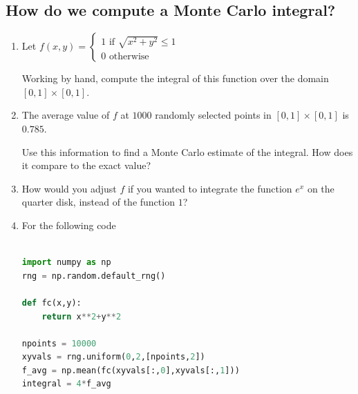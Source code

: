 \documentclass[12pt,letterpaper,noanswers]{exam}
\begin{document}
\subsection*{How do we compute a Monte Carlo integral?}

\begin{enumerate}[resume]
    \item Let $f(x,y) = \left\{\begin{array}{l} 1\text{ if } \sqrt{x^2+y^2}\leq 1 \\
    0 \text{ otherwise }
     \end{array}\right.$

    Working by hand, compute the integral of this function over the domain $[0,1]\times [0,1]$.

\vspace{1in}
    
     \item The average value of $f$ at $1000$ randomly selected points in $[0,1]\times [0,1]$ is $0.785$.

     Use this information to find a Monte Carlo estimate of the integral.  How does it compare to the exact value?

     \vspace{1in}

     \item How would you adjust $f$ if you wanted to integrate the function $e^x$ on the quarter disk, instead of the function $1$?

\vspace{1in}

\item 
For the following code
\begin{lstlisting}[basicstyle=\small,language=python]

import numpy as np
rng = np.random.default_rng()

def fc(x,y): 
    return x**2+y**2
    
npoints = 10000
xyvals = rng.uniform(0,2,[npoints,2])
f_avg = np.mean(fc(xyvals[:,0],xyvals[:,1]))
integral = 4*f_avg
\end{lstlisting}
\end{enumerate}
\end{document}
